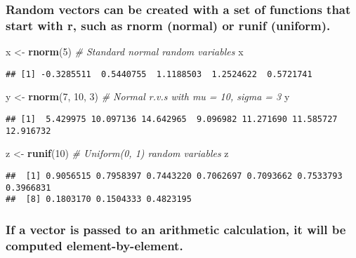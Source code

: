 \documentclass[]{article}
\newenvironment{Shaded}{\begin{snugshade}}{\end{snugshade}}
\newcommand{\KeywordTok}[1]{\textcolor[rgb]{0.13,0.29,0.53}{\textbf{#1}}}
\newcommand{\DecValTok}[1]{\textcolor[rgb]{0.00,0.00,0.81}{#1}}
\newcommand{\StringTok}[1]{\textcolor[rgb]{0.31,0.60,0.02}{#1}}
\newcommand{\CommentTok}[1]{\textcolor[rgb]{0.56,0.35,0.01}{\textit{#1}}}
\newcommand{\NormalTok}[1]{#1}
\begin{document}
\subsubsection{Random vectors can be created with a set of functions
that start with r, such as rnorm (normal) or runif
(uniform).}\label{random-vectors-can-be-created-with-a-set-of-functions-that-start-with-r-such-as-rnorm-normal-or-runif-uniform.}

\begin{Shaded}
\begin{Highlighting}[]
\NormalTok{x <-}\StringTok{ }\KeywordTok{rnorm}\NormalTok{(}\DecValTok{5}\NormalTok{) }\CommentTok{# Standard normal random variables}
\NormalTok{x}
\end{Highlighting}
\end{Shaded}

\begin{verbatim}
## [1] -0.3285511  0.5440755  1.1188503  1.2524622  0.5721741
\end{verbatim}

\begin{Shaded}
\begin{Highlighting}[]
\NormalTok{y <-}\StringTok{ }\KeywordTok{rnorm}\NormalTok{(}\DecValTok{7}\NormalTok{, }\DecValTok{10}\NormalTok{, }\DecValTok{3}\NormalTok{) }\CommentTok{# Normal r.v.s with mu = 10, sigma = 3}
\NormalTok{y}
\end{Highlighting}
\end{Shaded}

\begin{verbatim}
## [1]  5.429975 10.097136 14.642965  9.096982 11.271690 11.585727 12.916732
\end{verbatim}

\begin{Shaded}
\begin{Highlighting}[]
\NormalTok{z <-}\StringTok{ }\KeywordTok{runif}\NormalTok{(}\DecValTok{10}\NormalTok{) }\CommentTok{# Uniform(0, 1) random variables}
\NormalTok{z}
\end{Highlighting}
\end{Shaded}

\begin{verbatim}
##  [1] 0.9056515 0.7958397 0.7443220 0.7062697 0.7093662 0.7533793 0.3966831
##  [8] 0.1803170 0.1504333 0.4823195
\end{verbatim}

\subsubsection{If a vector is passed to an arithmetic calculation, it
will be computed
element-by-element.}\label{if-a-vector-is-passed-to-an-arithmetic-calculation-it-will-be-computed-element-by-element.}
\end{document}

